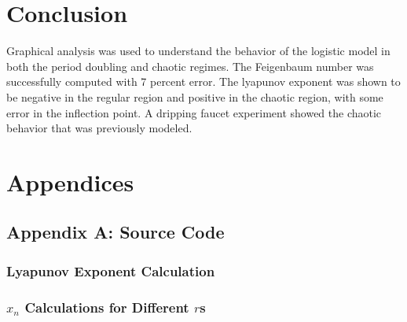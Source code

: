 \documentclass[a4paper]{article}
\begin{document}
\section{Conclusion}
\qq Graphical analysis was used to understand the behavior of the logistic model in both the period doubling and chaotic regimes. The Feigenbaum number was successfully computed with 7 percent error. The lyapunov exponent was shown to be negative in the regular region and positive in the chaotic region, with some error in the inflection point. A dripping faucet experiment showed the chaotic behavior that was previously modeled.

\section{Appendices}

\subsection{Appendix A: Source Code}

\subsubsection{Lyapunov Exponent Calculation}
\label{cod:lyapunov}

\subsubsection{\( x_n \) Calculations for Different \( r \)s}
\label{cod:xnVr}
\end{document}
